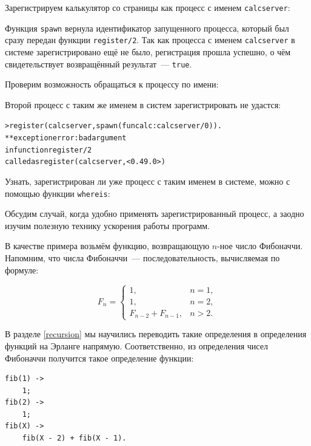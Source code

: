 \documentclass[
  paper=a4,
  fontsize=14pt,
  openany,
  appendixprefix=true
]{scrbook}
\begin{document}
Зарегистрируем калькулятор со страницы \pageref{calcserver} как процесс с именем \lstinline{calcserver}:


Функция \lstinline{spawn} вернула идентификатор запущенного процесса, который был сразу передан функции \lstinline{register/2}. Так как процесса с именем \lstinline{calcserver} в системе зарегистрировано ещё не было, регистрация прошла успешно, о чём свидетельствует возвращённый результат~--- \lstinline{true}.

Проверим возможность обращаться к процессу по имени:


Второй процесс с таким же именем в систем зарегистрировать не удастся:

\begin{alltt}
> register(calcserver, spawn(fun calc:calcserver/0)).
** exception error: bad argument
     in function  register/2
        called as register(calcserver,<0.49.0>)
\addtocounter{erlcommand}{1}
\end{alltt}

Узнать, зарегистрирован ли уже процесс с таким именем в системе, можно с помощью функции \lstinline{whereis}:


Обсудим случай, когда удобно применять зарегистрированный процесс, а заодно изучим полезную технику ускорения работы программ.

В качестве примера возьмём функцию, возвращающую $n$-ное число Фибоначчи. Напомним, что числа Фибоначчи~--- последовательность, вычисляемая по формуле:

$$
F_n = \begin{cases}
1,&n = 1,\\
1,&n = 2,\\
F_{n-2} + F_{n-1},&n > 2.
\end{cases}
$$

В разделе \ref{recursion} мы научились переводить такие определения в определения функций на Эрланге напрямую. Соответственно, из определения чисел Фибоначчи получится такое определение функции:

\begin{lstlisting}
fib(1) ->
    1;
fib(2) ->
    1;
fib(X) ->
    fib(X - 2) + fib(X - 1).
\end{lstlisting}
\end{document}
